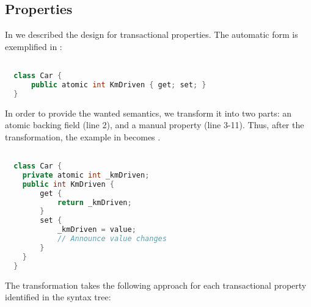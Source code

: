 \subsection{Properties}
In  we described the design for transactional properties. The automatic form is exemplified in :

\begin{lstlisting}[label=lst:before_atomic_property,
  caption={Before Transformation},
  language=Java,  
  showspaces=false,
  showtabs=false,
  breaklines=true,
  showstringspaces=false,
  breakatwhitespace=true,
  commentstyle=\color{greencomments},
  keywordstyle=\color{bluekeywords},
  stringstyle=\color{redstrings},
  morekeywords={atomic, retry, orElse, var, get, set, string}]  % Start your code-block

  class Car {
      public atomic int KmDriven { get; set; }
  }
\end{lstlisting}

In order to provide the wanted semantics, we transform it into two parts: an atomic backing field (line 2), and a manual property (line 3-11). Thus, after the transformation, the example in  becomes . 

\begin{lstlisting}[label=lst:after_atomic_property,
  caption={After Transformation},
  language=Java,  
  showspaces=false,
  showtabs=false,
  breaklines=true,
  showstringspaces=false,
  breakatwhitespace=true,
  commentstyle=\color{greencomments},
  keywordstyle=\color{bluekeywords},
  stringstyle=\color{redstrings},
  morekeywords={atomic, retry, orElse, var, get, set}]  % Start your code-block

  class Car {
    private atomic int _kmDriven;
    public int KmDriven {
        get {
            return _kmDriven;
        }
        set {
            _kmDriven = value;
            // Announce value changes
        }
    }
  }
\end{lstlisting}

The transformation takes the following approach for each transactional property identified in the syntax tree:

